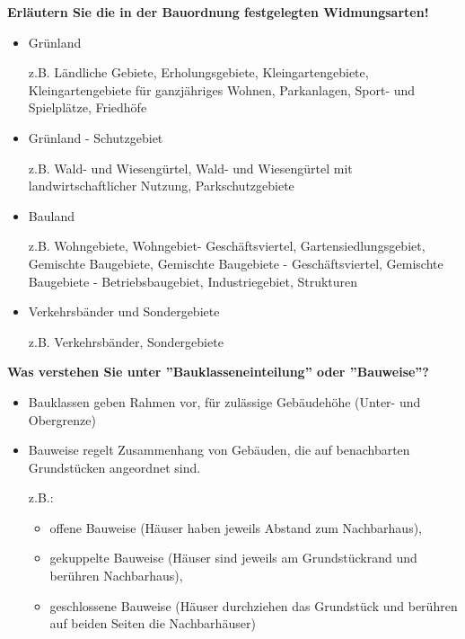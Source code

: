 \documentclass[]{article}
\newenvironment{question}{\vspace{8mm}\noindent\bfseries}{\\}
\begin{document}
\begin{question}
	Erläutern Sie die in der Bauordnung festgelegten Widmungsarten!
\end{question}
\begin{itemize}
	\item Grünland
	
	z.B. Ländliche Gebiete, Erholungsgebiete, Kleingartengebiete, Kleingartengebiete für ganzjähriges Wohnen, Parkanlagen, Sport- und Spielplätze, Friedhöfe
	
	\item Grünland - Schutzgebiet
	
	z.B. Wald- und Wiesengürtel, Wald- und Wiesengürtel mit landwirtschaftlicher Nutzung, Parkschutzgebiete
	
	\item Bauland
	
	z.B. Wohngebiete, Wohngebiet- Geschäftsviertel, Gartensiedlungsgebiet, Gemischte Baugebiete, Gemischte Baugebiete - Geschäftsviertel, Gemischte Baugebiete - Betriebsbaugebiet, Industriegebiet, Strukturen
	
	\item Verkehrsbänder und Sondergebiete
	
	z.B. Verkehrsbänder, Sondergebiete
\end{itemize}

\begin{question}
	Was verstehen Sie unter ''Bauklasseneinteilung'' oder ''Bauweise''?
\end{question}
\begin{itemize}
	\item Bauklassen geben Rahmen vor, für zulässige Gebäudehöhe (Unter- und Obergrenze)
	\item Bauweise regelt Zusammenhang von Gebäuden, die auf benachbarten Grundstücken angeordnet sind.
	
	z.B.:
	\begin{itemize}
		\item offene Bauweise (Häuser haben jeweils Abstand zum Nachbarhaus),
		\item gekuppelte Bauweise (Häuser sind jeweils am Grundstückrand und berühren Nachbarhaus),
		\item geschlossene Bauweise (Häuser durchziehen das Grundstück und berühren auf beiden Seiten die Nachbarhäuser)
	\end{itemize}  
\end{itemize}
\end{document}
